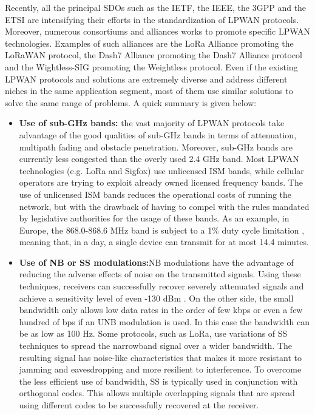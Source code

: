 Recently, all the principal \glspl{SDO} such as the \gls{IETF}, the \gls{IEEE}, the \gls{3GPP} and the \gls{ETSI} are intensifying their efforts in the standardization of \gls{LPWAN} protocols. Moreover, numerous consortiums and alliances works to promote specific \gls{LPWAN} technologies. Examples of such alliances are the LoRa Alliance promoting the LoRaWAN protocol, the Dash7 Alliance promoting the Dash7 Alliance protocol and the Wightless-SIG promoting the Weightless protocol. Even if the existing \gls{LPWAN} protocols and solutions are extremely diverse and address different niches in the same application segment, most of them use similar solutions to solve the same range of problems. A quick summary is given below:

\begin{itemize}
\item \textbf{Use of sub-GHz bands:} the vast majority of \gls{LPWAN} protocols take advantage of the good qualities of sub-GHz bands in terms of attenuation, multipath fading and obstacle penetration. Moreover, sub-GHz bands are currently less congested than the overly used 2.4 GHz band. Most \gls{LPWAN} technologies (e.g. LoRa and Sigfox) use unlicensed \gls{ISM} bands, while cellular operators are trying to exploit already owned licensed frequency bands. The use of unlicensed \gls{ISM} bands reduces the operational costs of running the network, but with the drawback of having to compel with the rules mandated by legislative authorities for the usage of these bands. As an example, in Europe, the 868.0-868.6 MHz band is subject to a 1\% duty cycle limitation \cite{missing}, meaning that, in a day, a single device can transmit for at most 14.4 minutes.

\item \textbf{Use of \gls{NB} or \gls{SS} modulations:}\gls{NB} modulations have the advantage of reducing the adverse effects of noise on the transmitted signals. Using these techniques, receivers can successfully recover severely attenuated signals and achieve a sensitivity level of even -130 dBm \cite{missing}. On the other side, the small bandwidth only allows low data rates in the order of few kbps or even a few hundred of bps if an \gls{UNB} modulation is used. In this case the bandwidth can be as low as 100 Hz. Some protocols, such as LoRa, use variations of \gls{SS} techniques to spread the narrowband signal over a wider bandwidth. The resulting signal has noise-like characteristics that makes it more resistant to jamming and eavesdropping and more resilient to interference. To overcome the less efficient use of bandwidth, \gls{SS} is typically used in conjunction with orthogonal codes. This allows multiple overlapping signals that are spread using different codes to be successfully recovered at the receiver.


\end{itemize}
